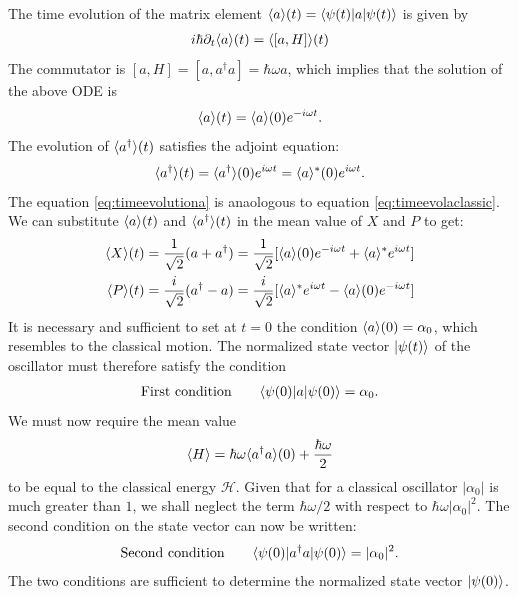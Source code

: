 The time evolution of the matrix element $\langle a\rangle(t)=\langle\psi(t)|a|\psi(t)\rangle$ is given by 
\begin{align*}
    i\hbar\partial_t\langle a\rangle(t)=\langle[a,H]\rangle(t)
\end{align*}
The commutator is $[a,H]=[a,a^\dagger a]=\hbar\omega a$, which implies that the solution of the above ODE is 
\begin{align}
    \langle a\rangle(t)=\langle a\rangle(0)e^{-i\omega t}.
    \label{eq:timeevolutiona}
\end{align}
The evolution of $\langle a^\dagger\rangle(t)$ satisfies the adjoint equation:
\begin{align*}
    \langle a^\dagger\rangle(t)=\langle a^\dagger\rangle(0)e^{i\omega t}=\langle a\rangle^*(0)e^{i\omega t}.
\end{align*}
The equation \eqref{eq:timeevolutiona} is anaologous to equation \eqref{eq:timeevolaclassic}. We can substitute $\langle a\rangle(t)$ and $\langle a^\dagger\rangle(t)$ in 
the mean value of $X$ and $P$ to get:
\begin{align}
    \langle X\rangle(t)&=\frac{1}{\sqrt{2}}(a+a^\dagger)=\frac{1}{\sqrt{2}}[\langle a\rangle(0)e^{-i\omega t}+\langle a\rangle^*e^{i\omega t}]\\
    \langle P\rangle(t)&=\frac{i}{\sqrt{2}}(a^\dagger-a)=\frac{i}{\sqrt{2}}[\langle a\rangle^*e^{i\omega t}-\langle a\rangle(0)e^{-i\omega t}]
\end{align}
It is necessary and sufficient to set at $t=0$ the condition $\langle a\rangle(0)=\alpha_0$, which resembles to the classical motion. The normalized state vector $|\psi(t)\rangle$ of the oscillator 
must therefore satisfy the condition 
\begin{align*}
    \text{First condition}\qquad\langle\psi(0)|a|\psi(0)\rangle=\alpha_0.
\end{align*}
We must now require the mean value 
\begin{align}
    \langle H\rangle=\hbar\omega\langle a^\dagger a\rangle(0)+\frac{\hbar\omega}{2}
\end{align}
to be equal to the classical energy $\mathcal{H}$. Given that for a classical oscillator $|\alpha_0|$ is much greater than $1$, we shall neglect the term $\hbar\omega/2$ with respect to 
$\hbar\omega|\alpha_0|^2$. The second condition on the state vector can now be written:
\begin{align}
    \text{Second condition}\qquad\langle\psi(0)|a^\dagger a|\psi(0)\rangle=|\alpha_0|^2.
\end{align}
The two conditions are sufficient to determine the normalized state vector $|\psi(0)\rangle$.
%
